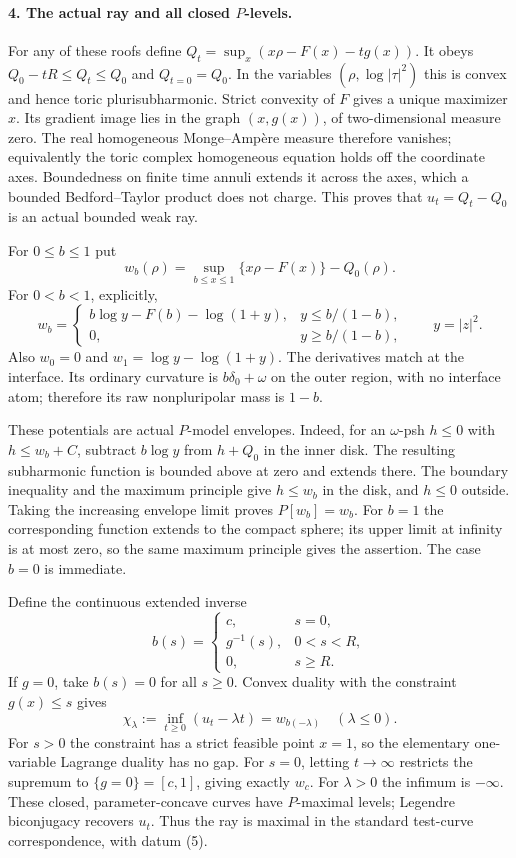 \documentclass[11pt]{article}
\begin{document}
\paragraph{4. The actual ray and all closed $P$-levels.}
For any of these roofs define $Q_t=\sup_x(x\rho-F(x)-tg(x))$.
It obeys $Q_0-tR\le Q_t\le Q_0$ and $Q_{t=0}=Q_0$.
In the variables $(\rho,\log|\tau|^2)$ this is convex and hence
toric plurisubharmonic. Strict convexity of $F$ gives a unique
maximizer $x$. Its gradient image lies in the graph $(x,g(x))$,
of two-dimensional measure zero. The real homogeneous
Monge--Amp\`ere measure therefore vanishes; equivalently the toric
complex homogeneous equation holds off the coordinate axes.
Boundedness on finite time annuli extends it across the axes,
which a bounded Bedford--Taylor product does not charge.
This proves that $u_t=Q_t-Q_0$ is an actual bounded weak ray.

For $0\le b\le1$ put
\[
 w_b(\rho)=\sup_{b\le x\le1}\{x\rho-F(x)\}-Q_0(\rho).
\]
For $0<b<1$, explicitly,
\[
 w_b=\begin{cases}
 b\log y-F(b)-\log(1+y),&y\le b/(1-b),\\
 0,&y\ge b/(1-b),
 \end{cases}\qquad y=|z|^2.                             \tag{8}
\]
Also $w_0=0$ and $w_1=\log y-\log(1+y)$.
The derivatives match at the interface. Its ordinary curvature
is $b\delta_0+\omega$ on the outer region, with no interface atom;
therefore its raw nonpluripolar mass is $1-b$.

These potentials are actual $P$-model envelopes. Indeed, for an
$\omega$-psh $h\le0$ with $h\le w_b+C$, subtract $b\log y$ from
$h+Q_0$ in the inner disk. The resulting subharmonic function is
bounded above at zero and extends there. The boundary inequality
and the maximum principle give $h\le w_b$ in the disk, and $h\le0$
outside. Taking the increasing envelope limit proves $P[w_b]=w_b$.
For $b=1$ the corresponding function extends to the compact sphere;
its upper limit at infinity is at most zero, so the same maximum
principle gives the assertion. The case $b=0$ is immediate.

Define the continuous extended inverse
\[
 b(s)=\begin{cases}
 c,&s=0,\\
 g^{-1}(s),&0<s<R,\\
 0,&s\ge R.
 \end{cases}                                            \tag{9}
\]
If $g=0$, take $b(s)=0$ for all $s\ge0$.
Convex duality with the constraint $g(x)\le s$ gives
\[
 \chi_\lambda:=\inf_{t\ge0}(u_t-\lambda t)
                  =w_{b(-\lambda)}\quad (\lambda\le0). \tag{10}
\]
For $s>0$ the constraint has a strict feasible point $x=1$, so
the elementary one-variable Lagrange duality has no gap.
For $s=0$, letting $t\to\infty$ restricts the supremum to
$\{g=0\}=[c,1]$, giving exactly $w_c$.
For $\lambda>0$ the infimum is $-\infty$.
These closed, parameter-concave curves have $P$-maximal levels;
Legendre biconjugacy recovers $u_t$. Thus the ray is maximal in
the standard test-curve correspondence, with datum (5).
\end{document}
